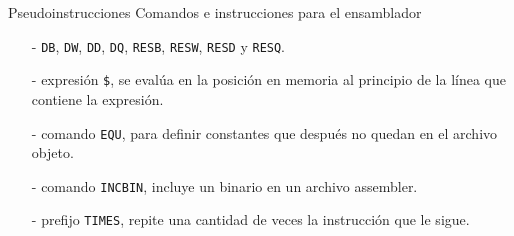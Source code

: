 \documentclass[aspectratio=169]{beamer}
\begin{document}
\begin{frame}[fragile]{Pseudoinstrucciones}
    Comandos e instrucciones para el ensamblador
    \vspace{.4cm}
    \begin{itemize}
    \setlength\itemsep{1em}
    \pause
    \item[-] \texttt{DB}, \texttt{DW}, \texttt{DD}, \texttt{DQ}, \texttt{RESB}, \texttt{RESW}, \texttt{RESD} y \texttt{RESQ}.
    \pause
    \item[-] expresión \verb|$|, se evalúa en la posición en memoria al principio de la línea que contiene la expresión.
    \pause
    \item[-] comando \verb|EQU|, para definir constantes que después no quedan en el archivo objeto.
    \pause
    \item[-] comando \verb|INCBIN|, incluye un binario en un archivo assembler.
    \pause
    \item[-] prefijo \verb|TIMES|, repite una cantidad de veces la instrucción que le sigue.
    \end{itemize}
\end{frame}
\end{document}
